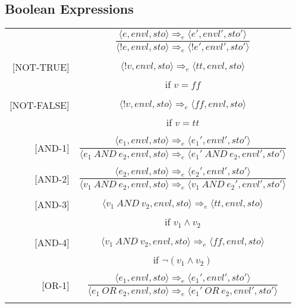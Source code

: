 \subsection{Boolean Expressions}
\begin{longtable}[c] { r c }
  \centering
  [NOT-1] & \( 
    \dfrac { \langle e, envl, sto \rangle \Rightarrow_e \langle e', envl', sto' \rangle }
      { \langle !e, envl, sto \rangle \Rightarrow_e \langle !e', envl', sto' \rangle } \)
  \\
  & \\

  [NOT-TRUE] & \( 
    \langle !v, envl, sto \rangle \Rightarrow_e \langle tt, envl, sto \rangle \)
  \\
  & if \( v = ff\) \\
  & \\

  [NOT-FALSE] & \( 
    \langle !v, envl, sto \rangle \Rightarrow_e \langle ff, envl, sto \rangle \)
  \\
  & if \( v = tt \) \\
  & \\

  [AND-1] & \( 
    \dfrac { \langle e_1, envl, sto \rangle \Rightarrow_e \langle e_1', envl', sto' \rangle }
      { \langle e_1 \ AND \ e_2, envl, sto \rangle \Rightarrow_e \langle e_1' \ AND \ e_2, envl', sto' \rangle } \)
  \\
  & \\

  [AND-2] & \( 
    \dfrac { \langle e_2, envl, sto \rangle \Rightarrow_e \langle e_2', envl', sto' \rangle }
      { \langle v_1 \ AND \ e_2, envl, sto \rangle \Rightarrow_e \langle v_1 \ AND \ e_2', envl', sto' \rangle } \)
  \\
  & \\

  [AND-3] & \( 
    \langle v_1 \ AND \ v_2, envl, sto \rangle \Rightarrow_e \langle tt, envl, sto \rangle \)
  \\
  & if \( v_1 \land v_2 \) \\
  & \\

  [AND-4] & \( 
    \langle v_1 \ AND \ v_2, envl, sto \rangle \Rightarrow_e \langle ff, envl, sto \rangle \)
  \\
  & if \( \neg(v_1 \land v_2) \) \\
  & \\

  [OR-1] & \( 
    \dfrac { \langle e_1, envl, sto \rangle \Rightarrow_e \langle e_1', envl', sto' \rangle }
      { \langle e_1 \ OR \ e_2, envl, sto \rangle \Rightarrow_e \langle e_1' \ OR \ e_2, envl', sto' \rangle } \)
  \\
  & \\


\end{longtable}
